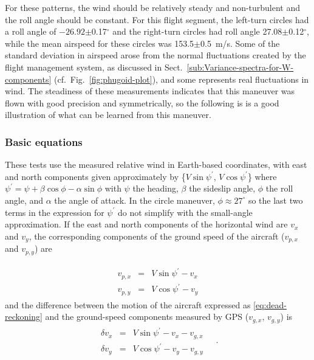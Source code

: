 \documentclass[12pt,twoside,english]{article}\usepackage[]{graphicx}\usepackage[]{color}
\let\OrgIndex\index
\renewcommand*{\index}[1]{\OrgIndex{#1}}
\begin{document}
{{For these patterns, the wind should be relatively steady and non-turbulent and the roll angle should be constant. For this flight segment, the left-turn circles had a roll angle of \ensuremath{-26.92}$\pm$0.17$^{\circ}$ and the right-turn circles had roll angle 27.08$\pm$0.12$^{\circ}$, while the mean airspeed for these circles was 153.5$\pm$0.5~m/s. Some of the standard deviation in airspeed arose from the normal fluctuations created by the flight management system, as discussed in Sect.~\ref{sub:Variance-spectra-for-W-components} (cf.~Fig.~\ref{fig:phugoid-plot}), and some represents real fluctuations in wind. The steadiness of these measurements indicates that this maneuver was flown with good precision and symmetrically, so the following is is a good illustration of what can be learned from this maneuver. 

\subsubsection{Basic equations}

These tests use the measured relative wind in Earth-based coordinates, with east and north components given approximately by \{$V\sin\psi^{\prime}$, $V\cos\psi^{\prime}$\} where $\psi^{\prime}=\psi+\beta\cos\phi-\alpha\sin\phi$ with $\psi$ the heading, $\beta$ the sideslip angle, $\phi$ the roll angle, and $\alpha$ the angle of attack. In the circle maneuver, $\phi\approx27^{\circ}$ so the last two terms in the expression for $\psi^{\prime}$ do not simplify with the small-angle approximation. If the east and north components of the horizontal wind are $v_{x}$ and $v_{y}$, the corresponding components of the ground speed of the aircraft ($v_{p,x}$ and $v_{p,y}$) are 

\begin{eqnarray}
\begin{split}
v_{p,x} & = & V\sin\psi^{\prime}-v_{x}\\ v_{p,y} & = & V\cos\psi^{\prime}-v_{y} 
\end{split}
\label{eq:dead-reckoning}
\end{eqnarray}
and the difference between the motion of the aircraft expressed as \eqref{eq:dead-reckoning} and the ground-speed components measured by GPS ($v_{g,x},\,v_{g,y}$) is\\ 
\begin{eqnarray}
\begin{split}
\delta v_{x} & = & V\sin\psi^{\prime}-v_{x}-v_{g,x}\\ 
\delta v_{y} & = & V\cos\psi^{\prime}-v_{y}-v_{g,y} 
\end{split}
~~~~~.\label{eq:v-errors} 
\end{eqnarray}

}}
\end{document}
